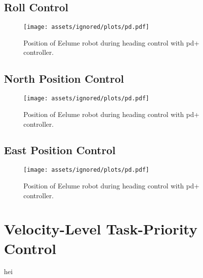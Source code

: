 \FloatBarrier


\subsection{Roll Control}

\begin{figure}[!ht]
    \centering
    \texttt{[image: assets/ignored/plots/pd.pdf]}
    \label{fig:results:dp_roll:pos}
    \caption{Position of Eelume robot during heading control with \gls{pd+} controller.}
\end{figure}

\FloatBarrier


\subsection{North Position Control}
\begin{figure}[!ht]
    \centering
    \texttt{[image: assets/ignored/plots/pd.pdf]}
    \label{fig:results:dp_north:pos}
    \caption{Position of Eelume robot during heading control with \gls{pd+} controller.}
\end{figure}

\FloatBarrier


\subsection{East Position Control}
\begin{figure}[!ht]
    \centering
    \texttt{[image: assets/ignored/plots/pd.pdf]}
    \label{fig:results:dp_east:pos}
    \caption{Position of Eelume robot during heading control with \gls{pd+} controller.}
\end{figure}

\FloatBarrier

\section{Velocity-Level Task-Priority Control}

hei

